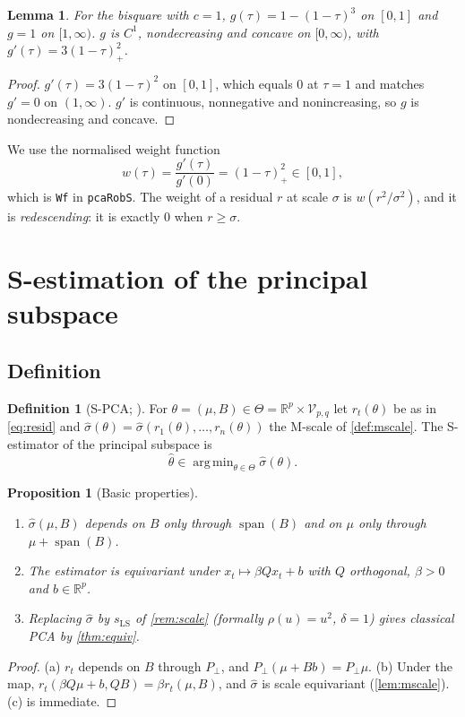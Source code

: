 \documentclass[11pt]{article}
\newtheorem{proposition}[theorem]{Proposition}
\newtheorem{lemma}[theorem]{Lemma}
\theoremstyle{definition}
\newtheorem{definition}[theorem]{Definition}
\theoremstyle{remark}
\DeclareMathOperator{\spn}{span}
\DeclareMathOperator*{\argmin}{arg\,min}
\newcommand{\R}{\mathbb{R}}
\newcommand{\V}{\mathcal{V}}
\newcommand{\Pp}{P_{\!\perp}}
\begin{document}
\begin{lemma}\label{lem:gconcave}
For the bisquare with $c=1$, $g(\tau)=1-(1-\tau)^3$ on $[0,1]$ and $g=1$ on $[1,\infty)$. $g$ is $C^1$, nondecreasing
and concave on $[0,\infty)$, with $g'(\tau)=3(1-\tau)_+^2$.
\end{lemma}
\begin{proof}
$g'(\tau)=3(1-\tau)^2$ on $[0,1]$, which equals $0$ at $\tau=1$ and matches $g'=0$ on $(1,\infty)$. $g'$ is continuous,
nonnegative and nonincreasing, so $g$ is nondecreasing and concave.
\end{proof}

We use the normalised weight function
\begin{equation}\label{eq:weight}
w(\tau)=\frac{g'(\tau)}{g'(0)}=(1-\tau)_+^2\in[0,1],
\end{equation}
which is \texttt{Wf} in \texttt{pcaRobS}. The weight of a residual $r$ at scale $\sigma$ is $w(r^2/\sigma^2)$, and it is
\emph{redescending}: it is exactly $0$ when $r\ge\sigma$.

\section{S-estimation of the principal subspace}\label{sec:spca}

\subsection{Definition}

\begin{definition}[S-PCA; \citealp{Maronna2005}]\label{def:spca}
For $\theta=(\mu,B)\in\Theta=\R^p\times\V_{p,q}$ let $r_t(\theta)$ be as in \eqref{eq:resid} and
$\hat\sigma(\theta)=\hat\sigma(r_1(\theta),\dots,r_n(\theta))$ the M-scale of \cref{def:mscale}. The S-estimator of the
principal subspace is
\[
\hat\theta\in\argmin_{\theta\in\Theta}\hat\sigma(\theta).
\]
\end{definition}

\begin{proposition}[Basic properties]\label{prop:basic}
\begin{enumerate}[label=(\alph*)]
\item $\hat\sigma(\mu,B)$ depends on $B$ only through $\spn(B)$ and on $\mu$ only through $\mu+\spn(B)$.
\item The estimator is equivariant under $x_t\mapsto \beta Qx_t+b$ with $Q$ orthogonal, $\beta>0$ and $b\in\R^p$.
\item Replacing $\hat\sigma$ by $s_{\mathrm{LS}}$ of \cref{rem:scale} (formally $\rho(u)=u^2$, $\delta=1$)
gives classical PCA by \cref{thm:equiv}.
\end{enumerate}
\end{proposition}
\begin{proof}
(a) $r_t$ depends on $B$ through $\Pp$, and $\Pp(\mu+Bb)=\Pp\mu$. (b) Under the map, $r_t(\beta Q\mu+b,QB)=\beta r_t(\mu,B)$,
and $\hat\sigma$ is scale equivariant (\cref{lem:mscale}). (c) is immediate.
\end{proof}
\end{document}
